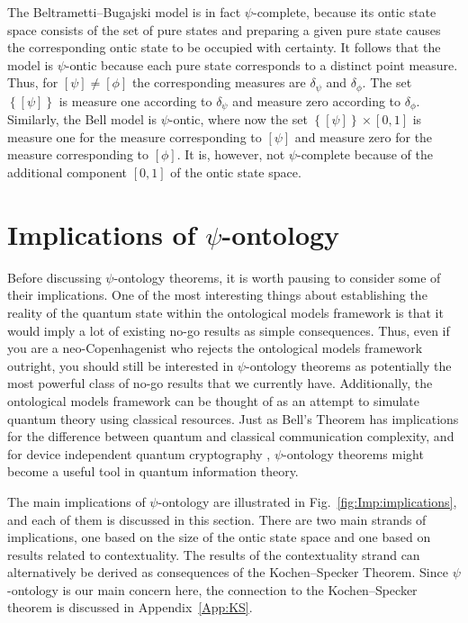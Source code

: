 \documentclass[DIV=calc,fontsize=12pt]{scrartcl} %
\theoremstyle{definition}
\theoremstyle{plain}
\newcommand{\Proj}[1]{\ensuremath{\left [ #1 \right ]}}
\begin{document}
The Beltrametti--Bugajski model is in fact $\psi$-complete, because its
ontic state space consists of the set of pure states and preparing a
given pure state causes the corresponding ontic state to be occupied
with certainty.  It follows that the model is $\psi$-ontic because
each pure state corresponds to a distinct point measure.  Thus, for
$\Proj{\psi} \neq \Proj{\phi}$ the corresponding measures are
$\delta_{\psi}$ and $\delta_{\phi}$.  The set $\left
\{\Proj{\psi} \right \}$ is measure one according to
$\delta_{\psi}$ and measure zero according to
$\delta_{\phi}$.  Similarly, the Bell model is $\psi$-ontic,
where now the set $\left \{\Proj{\psi} \right \} \times [0,1]$ is
measure one for the measure corresponding to $\Proj{\psi}$ and measure
zero for the measure corresponding to $\Proj{\phi}$.  It is, however,
not $\psi$-complete because of the additional component $[0,1]$ of the
ontic state space.

\section{Implications of $\psi$-ontology}

\label{Imp}

Before discussing $\psi$-ontology theorems, it is worth pausing to
consider some of their implications.  One of the most interesting
things about establishing the reality of the quantum state within the
ontological models framework is that it would imply a lot of existing
no-go results as simple consequences.  Thus, even if you are a
neo-Copenhagenist who rejects the ontological models framework
outright, you should still be interested in $\psi$-ontology theorems
as potentially the most powerful class of no-go results that we
currently have.  Additionally, the ontological models framework can be
thought of as an attempt to simulate quantum theory using classical
resources.  Just as Bell's Theorem has implications for the difference
between quantum and classical communication complexity, and for device
independent quantum cryptography \cite{Brunner2013}, $\psi$-ontology
theorems might become a useful tool in quantum information theory.

The main implications of $\psi$-ontology are illustrated in
Fig.~\ref{fig:Imp:implications}, and each of them is discussed in this
section.  There are two main strands of implications, one based on the
size of the ontic state space and one based on results related to
contextuality.  The results of the contextuality strand can
alternatively be derived as consequences of the Kochen--Specker
Theorem.  Since $\psi$-ontology is our main concern here, the
connection to the Kochen--Specker theorem is discussed in
Appendix~\ref{App:KS}.
\end{document}
